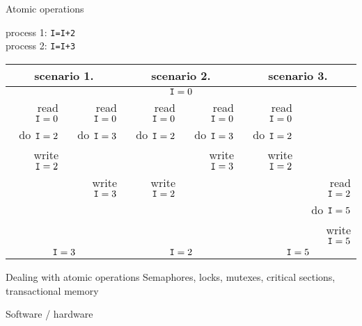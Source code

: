 \begin{numberedframe}{Atomic operations}
\begin{tabbing}
  process 1: \texttt{I=I+2}\\
  process 2: \texttt{I=I+3}
\end{tabbing}
\footnotesize
\begin{tabular}{|rr|rr|rr|}
  \toprule
  \multicolumn{2}{|c|}{scenario 1.}& \multicolumn{2}{|c|}{scenario 2.}&
  \multicolumn{2}{|c|}{scenario 3.}\\ \midrule
  \multicolumn{6}{|c|}{$\n{I}=0$}\\ \midrule
  read $\n{I}=0$&read $\n{I}=0$&
    read $\n{I}=0$&read $\n{I}=0$&
      read $\n{I}=0$& \\
  do $\n{I}=2$&do $\n{I}=3$& 
    do $\n{I}=2$&do $\n{I}=3$&
      do $\n{I}=2$& \\
  write $\n{I}=2$& & &write $\n{I}=3$&write $\n{I}=2$& \\
  &write $\n{I}=3$&write $\n{I}=2$& & &read $\n{I}=2$\\
  &&&&&do $\n{I}=5$\\
  &&&&&write $\n{I}=5$\\
  \midrule
  \multicolumn{2}{|c|}{$\n{I}=3$}& \multicolumn{2}{|c|}{$\n{I}=2$}&
  \multicolumn{2}{|c|}{$\n{I}=5$}\\ \bottomrule
\end{tabular}
\end{numberedframe}

\begin{numberedframe}{Dealing with atomic operations}
  Semaphores, locks, mutexes, critical sections, transactional memory

  Software / hardware
\end{numberedframe}

